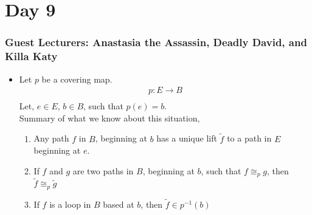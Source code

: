 \documentclass[../notes.tex]{subfiles}
\begin{document}
\section{Day 9}
    \subsubsection{Guest Lecturers: Anastasia the Assassin, Deadly David, and Killa Katy}
    \begin{itemize}
        \item Let $p$ be a covering map.
            \begin{align*}
                p: E\rightarrow B\\
            \end{align*}
            Let, $e\in E$, $b\in B$, such that $p(e)=b$.\\
            Summary of what we know about this situation,
            \begin{enumerate}
                \item Any path $f$ in $B$, beginning at $b$ has a unique lift $\tilde{f}$ to a path in $E$ beginning at $e$.
                \item If $f$ and $g$ are two paths in $B$, beginning at $b$, such that $f\cong_{p}g$, then
                    $\tilde{f}\cong_{p}\tilde{g}$
                \item If $f$ is a loop in $B$ based at $b$, then $\tilde{f}\in p^{-1}(b)$
            \end{enumerate}
    \end{itemize}
\end{document}
